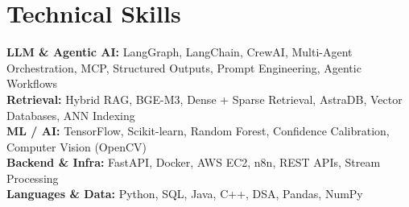 \documentclass[letterpaper,10.5pt]{article}
\begin{document}
\section{Technical Skills}
\vspace{-2pt}
\begin{itemize}[leftmargin=0.15in, label={}, itemsep=0pt, parsep=0pt]
  \small{\item{
    \textbf{LLM \& Agentic AI:} LangGraph, LangChain, CrewAI, Multi-Agent Orchestration, MCP, Structured Outputs, Prompt Engineering, Agentic Workflows \\
    \textbf{Retrieval:} Hybrid RAG, BGE-M3, Dense + Sparse Retrieval, AstraDB, Vector Databases, ANN Indexing \\
    \textbf{ML / AI:} TensorFlow, Scikit-learn, Random Forest, Confidence Calibration, Computer Vision (OpenCV) \\
    \textbf{Backend \& Infra:} FastAPI, Docker, AWS EC2, n8n, REST APIs, Stream Processing \\
    \textbf{Languages \& Data:} Python, SQL, Java, C++, DSA, Pandas, NumPy
  }}
\end{itemize}
\end{document}
